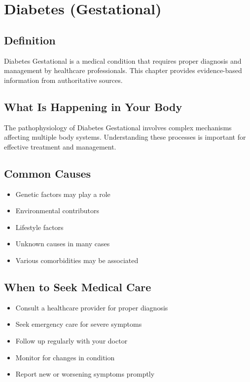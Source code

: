 
\chapter{Diabetes (Gestational)}

\section*{Definition}
Diabetes Gestational is a medical condition that requires proper diagnosis and management by healthcare professionals. This chapter provides evidence-based information from authoritative sources.

\section*{What Is Happening in Your Body}
The pathophysiology of Diabetes Gestational involves complex mechanisms affecting multiple body systems. Understanding these processes is important for effective treatment and management.

\section*{Common Causes}
\begin{itemize}
  \item Genetic factors may play a role
  \item Environmental contributors
  \item Lifestyle factors
  \item Unknown causes in many cases
  \item Various comorbidities may be associated
\end{itemize}

\section*{When to Seek Medical Care}
\begin{itemize}
  \item Consult a healthcare provider for proper diagnosis
  \item Seek emergency care for severe symptoms
  \item Follow up regularly with your doctor
  \item Monitor for changes in condition
  \item Report new or worsening symptoms promptly
\end{itemize}

